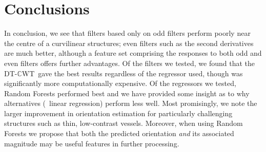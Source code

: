\documentclass[10pt,twocolumn,letterpaper]{article}
\def\dtcwt{DT-$\mathbb{C}$WT}
\newcommand{\comment}[1]{}
\begin{document}


%



\section{Conclusions}
\label{s:conclusions}
In conclusion, we see that filters based only on odd filters perform poorly near the centre of a curvilinear structures; even filters such as the second derivatives are much better, although a feature set comprising the responses to both odd and even filters offers further advantages. Of the filters we tested, we found that the \dtcwt~gave the best results regardless of the regressor used, though was significantly more computationally expensive. Of the regressors we tested, Random Forests performed best and we have provided some insight as to why alternatives (\eg~linear regression) perform less well. Most promisingly, we note the larger improvement in orientation estimation for particularly challenging structures such as thin, low-contrast vessels. Moreover, when using Random Forests we propose that both the predicted orientation \emph{and} its associated magnitude may be useful features in further processing. \comment{We must, however, take care when building regressors for orientation prediction in order to ensure that angles wrap around the circle correctly.}


{\small


}
\end{document}
